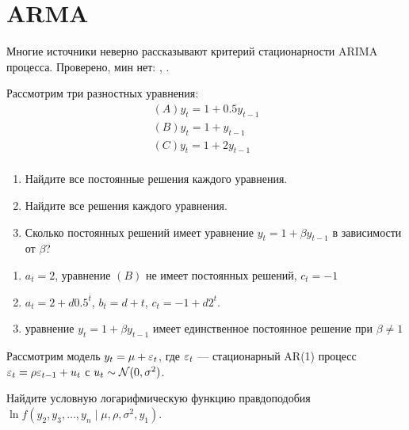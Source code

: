 
\chapter{ARMA}

Многие источники неверно рассказывают критерий стационарности ARIMA процесса. 
Проверено, мин нет: \cite{van2010time}, \cite{tsay2005analysis}.


\begin{problem}
Рассмотрим три разностных уравнения:
\begin{align*}
  (A) y_t = 1 + 0.5 y_{t-1} \\
  (B) y_t = 1 + y_{t-1} \\
  (C) y_t = 1 + 2 y_{t-1} \\
\end{align*}
\begin{enumerate}
  \item Найдите все постоянные решения каждого уравнения.
  \item Найдите все решения каждого уравнения. 
  \item Сколько постоянных решений имеет уравнение $y_t = 1 + \beta y_{t-1}$ в зависимости от $\beta$?
\end{enumerate}
\begin{sol}
  \begin{enumerate}
    \item $a_t = 2$, уравнение $(B)$ не имеет постоянных решений, $c_t = -1$
    \item $a_t = 2 + d 0.5^t$, $b_t = d + t$, $c_t = -1 + d 2^t$. 
    \item уравнение $y_t = 1 + \beta y_{t-1}$ имеет единственное постоянное решение при $\beta \neq 1$ 
  \end{enumerate}  
\end{sol}
\end{problem}
  

\begin{problem}
Рассмотрим модель $y_t=\mu + \varepsilon_t$, где $\varepsilon_t$ — стационарный AR(1) процесс $\varepsilon_t=\rho \varepsilon_{t-1} + u_t$ с $u_t \sim \mathcal{N}(0,\sigma^2)$. 

Найдите условную логарифмическую функцию правдоподобия $\ln f(y_2, y_3, \ldots, y_n \mid \mu, \rho, \sigma^2, y_1)$.
\begin{sol}

\end{sol}
\end{problem}


